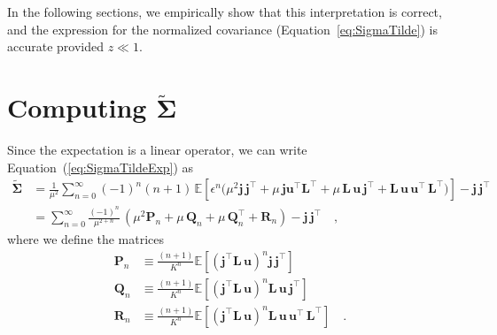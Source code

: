 \documentclass[modern]{aastex62}
\begin{document}
In the following sections, we empirically show that this interpretation is
correct, and the expression for the normalized covariance
(Equation~\ref{eq:SigmaTilde}) is accurate provided $z \ll 1$.


\ifdefined {}

    \clearpage

    \appendix

    \section{Computing $\tilde{\pmb{\Sigma}}$}
    Since the expectation is a linear operator, we can write Equation~(\ref{eq:SigmaTildeExp})
    as
    \begin{align}
        \tilde{\pmb{\Sigma}}
         & =
        \frac{1}{\mu^2}
        \sum\limits_{n=0}^\infty
        (-1)^n (n + 1)
        \,
        \mathbb{E}\left[
            \epsilon^n
            \Bigg(
            \mu^2 \mathbf{j} \, \mathbf{j}^\top
            +
            \mu \, \mathbf{j}\mathbf{u}^\top \mathbf{L}^\top
            +
            \mu \, \mathbf{L} \, \mathbf{u} \, \mathbf{j}^\top
            +
            \mathbf{L} \, \mathbf{u} \, \mathbf{u}^\top \, \mathbf{L}^\top
            \Bigg)
            \right]
        - \mathbf{j} \, \mathbf{j}^\top
        \nonumber \\[0.5em]
         & =
        \sum\limits_{n=0}^\infty
        \frac{(-1)^n}{\mu^{2 + n}}
        \,
        \left(
        \mu^2 \mathbf{P}_n
        +
        \mu \, \mathbf{Q}_n
        +
        \mu \, \mathbf{Q}_n^\top
        +
        \mathbf{R}_n
        \right)
        - \mathbf{j} \, \mathbf{j}^\top
        \quad,
    \end{align}
    where we define the matrices
    \begin{align}
        \mathbf{P}_n & \equiv \frac{(n + 1)}{K^n}\mathbb{E}\left[ \left(\mathbf{j}^\top \mathbf{L} \, \mathbf{u}\right)^n \mathbf{j} \, \mathbf{j}^\top \right]
        \nonumber                                                                                                                                                                                \\[0.5em]
        \mathbf{Q}_n & \equiv \frac{(n + 1)}{K^n}\mathbb{E}\left[ \left(\mathbf{j}^\top \mathbf{L} \, \mathbf{u}\right)^n \mathbf{L} \, \mathbf{u} \, \mathbf{j}^\top \right]
        \nonumber                                                                                                                                                                                \\[0.5em]
        \mathbf{R}_n & \equiv \frac{(n + 1)}{K^n}\mathbb{E}\left[ \left(\mathbf{j}^\top \mathbf{L} \, \mathbf{u}\right)^n \mathbf{L} \, \mathbf{u} \, \mathbf{u}^\top \, \mathbf{L}^\top \right]
        \quad.
    \end{align}
\end{document}
